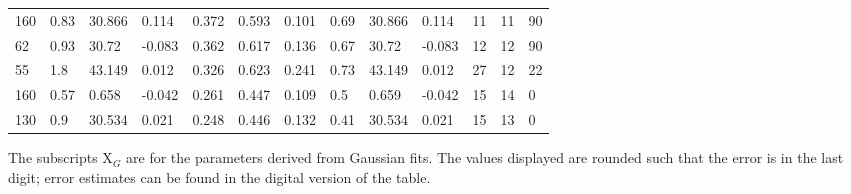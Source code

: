 \begin{table}[htp]
{\begin{tabular}{lllllllllllll}
160 & 0.83 & 30.866 & 0.114 & 0.372 & 0.593 & 0.101 & 0.69 & 30.866 & 0.114 & 11 & 11 & 90 \\
62 & 0.93 & 30.72 & -0.083 & 0.362 & 0.617 & 0.136 & 0.67 & 30.72 & -0.083 & 12 & 12 & 90 \\
55 & 1.8 & 43.149 & 0.012 & 0.326 & 0.623 & 0.241 & 0.73 & 43.149 & 0.012 & 27 & 12 & 22 \\
160 & 0.57 & 0.658 & -0.042 & 0.261 & 0.447 & 0.109 & 0.5 & 0.659 & -0.042 & 15 & 14 & 0 \\
130 & 0.9 & 30.534 & 0.021 & 0.248 & 0.446 & 0.132 & 0.41 & 30.534 & 0.021 & 15 & 13 & 0 \\
\hline
\end{tabular}
}\par
The subscripts X${_G}$ are for the parameters derived from Gaussian fits.  The values displayed are rounded such that the error is in the last digit; error estimates can be found in the digital version of the table.
\end{table}
